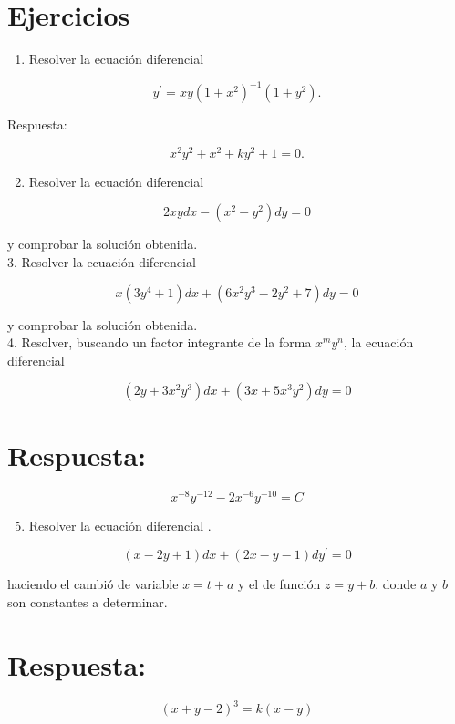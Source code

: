 \documentclass[10pt]{article}
\theoremstyle{plain}
\theoremstyle{definition}
\theoremstyle{remark}
\begin{document}
\section*{Ejercicios}
\begin{enumerate}
  \item Resolver la ecuación diferencial
\end{enumerate}

$$
y^{\prime}=x y\left(1+x^{2}\right)^{-1}\left(1+y^{2}\right) .
$$

Respuesta:

$$
x^{2} y^{2}+x^{2}+k y^{2}+1=0 .
$$

\begin{enumerate}
  \setcounter{enumi}{1}
  \item Resolver la ecuación diferencial
\end{enumerate}

$$
2 x y d x-\left(x^{2}-y^{2}\right) d y=0
$$

y comprobar la solución obtenida.\\
3. Resolver la ecuación diferencial

$$
x\left(3 y^{4}+1\right) d x+\left(6 x^{2} y^{3}-2 y^{2}+7\right) d y=0
$$

y comprobar la solución obtenida.\\
4. Resolver, buscando un factor integrante de la forma $x^{m} y^{n}$, la ecuación diferencial

$$
\left(2 y+3 x^{2} y^{3}\right) d x+\left(3 x+5 x^{3} y^{2}\right) d y=0
$$

\section*{Respuesta:}
$$
x^{-8} y^{-12}-2 x^{-6} y^{-10}=C
$$

\begin{enumerate}
  \setcounter{enumi}{4}
  \item Resolver la ecuación diferencial .
\end{enumerate}

$$
(x-2 y+1) d x+(2 x-y-1) d y^{\prime}=0
$$

haciendo el cambió de variable $x=t+a$ y el de función $z=y+b$. donde $a$ y $b$ son constantes a determinar.

\section*{Respuesta:}
$$
(x+y-2)^{3}=k(x-y)
$$
\end{document}
